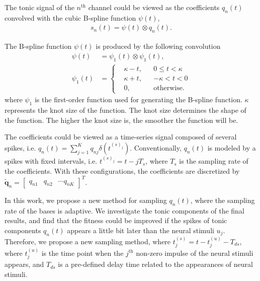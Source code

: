 \documentclass[10pt,conference]{ieeeconf}
\begin{document}
The tonic signal of the $n^{\mathrm{th}}$ channel could be viewed as the coefficients $q_n (t)$ convolved with the cubic B-spline function $\psi(t)$,
\begin{align} \label{fml:tonic-conv}
s_n(t) =  \psi(t) \otimes q_n (t).
\end{align}

The B-spline function $\psi(t)$ is produced by the following convolution
\begin{subequations}
  \renewcommand{\theequation}
  {\theparentequation-\arabic{equation}}
  \begin{align}
    \psi(t) &= \psi_1 (t) \otimes \psi_1 (t), \\
    \psi_1(t) &= \left\{\begin{aligned}
      &\kappa - t, && 0 \leqslant t < \kappa  \\
      &\kappa + t, && -\kappa < t < 0 \\
      &0, && \text{otherwise}.
    \end{aligned}\right.
  \end{align}
\end{subequations}
where $\psi_1$ is the first-order function used for generating the B-spline function. $\kappa$ represents the knot size of the function. The knot size determines the shape of the function. The higher the knot size is, the smoother the function will be. 

The coefficients could be viewed as a time-series signal composed of several spikes, i.e. $q_n (t) = \sum_{j=1}^K q_{nj} \delta(t^{(s)_j})$. Conventionally, $q_n(t)$ is modeled by a spikes with fixed intervals, i.e. $t^{(s)_j} = t - jT_s$, where $T_s$ is the sampling rate of the coefficients. With these configurations, the coefficients are discretized by $\tilde{\mathbf{q}}_n = \begin{bmatrix}
q_{n1} & q_{n2} & \cdots q_{nK}
\end{bmatrix}^T$.

In this work, we propose a new method for sampling $q_{n}(t)$, where the sampling rate of the bases is adaptive. We investigate the tonic components of the final results, and find that the fitness could be improved if the spikes of tonic components $q_n(t)$ appears a little bit later than the neural stimuli $u_j$. Therefore, we propose a new sampling method, where $t^{(s)}_j = t - t^{(u)}_j - T_{ds}$, where $t^{(u)}_j$ is the time point when the $j^{\mathrm{th}}$ non-zero impulse of the neural stimuli appears, and $T_{ds}$ is a pre-defined delay time related to the appearances of neural stimuli.
\end{document}
